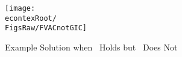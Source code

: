 \begin{figure}[tbp]
\centerline{\texttt{[image: \\econtexRoot/\\FigsRaw/FVACnotGIC]}}
\caption{Example Solution when \FVAC~Holds but \GIC~Does Not}
\label{fig:FVACnotGIC}
\end{figure}
